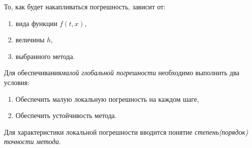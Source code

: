 \documentclass[a4paper,11pt]{article}
\begin{document}
  \noindent То, как будет накапливаться погрешность, зависит от:
  \begin{enumerate}
    \item вида функции $f(t, x)$,
    \item величины $h$,
    \item выбранного метода.
  \end{enumerate}
  Для обеспечивания\textit{малой глобальной погрешности} необходимо выполнить два условия:
  \begin{enumerate}
    \item Обеспечить малую локальную погрешность на каждом шаге,
    \item Обеспечить устойчивость метода.
  \end{enumerate}
  Для характеристики локальной погрешности вводится понятие \textit{степень(порядок) точности метода}.
\end{document}
